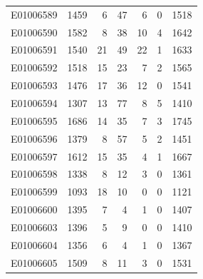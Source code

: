 \documentclass[
  letterpaper,
  DIV=11,
  numbers=noendperiod]{scrreprt}
\begin{document}
\begin{tabular}{lrrrrrr}
E01006589     &    1459 &       6 &                    47 &                               6 &                       0 &              1518 \\
E01006590     &    1582 &       8 &                    38 &                              10 &                       4 &              1642 \\
E01006591     &    1540 &      21 &                    49 &                              22 &                       1 &              1633 \\
E01006592     &    1518 &      15 &                    23 &                               7 &                       2 &              1565 \\
E01006593     &    1476 &      17 &                    36 &                              12 &                       0 &              1541 \\
E01006594     &    1307 &      13 &                    77 &                               8 &                       5 &              1410 \\
E01006595     &    1686 &      14 &                    35 &                               7 &                       3 &              1745 \\
E01006596     &    1379 &       8 &                    57 &                               5 &                       2 &              1451 \\
E01006597     &    1612 &      15 &                    35 &                               4 &                       1 &              1667 \\
E01006598     &    1338 &       8 &                    12 &                               3 &                       0 &              1361 \\
E01006599     &    1093 &      18 &                    10 &                               0 &                       0 &              1121 \\
E01006600     &    1395 &       7 &                     4 &                               1 &                       0 &              1407 \\
E01006603     &    1396 &       5 &                     9 &                               0 &                       0 &              1410 \\
E01006604     &    1356 &       6 &                     4 &                               1 &                       0 &              1367 \\
E01006605     &    1509 &       8 &                    11 &                               3 &                       0 &              1531 \\

\end{tabular}
\end{document}
